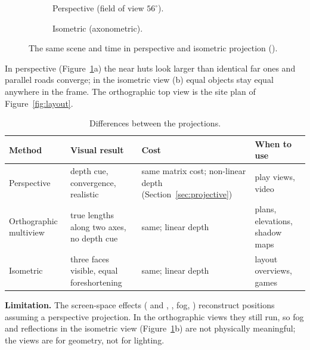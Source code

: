 \begin{figure}[htbp]
\centering
\begin{subfigure}[t]{0.495\linewidth}\caption{Perspective (field of view $56^\circ$).}\end{subfigure}\hfill
\begin{subfigure}[t]{0.495\linewidth}\caption{Isometric (axonometric).}\end{subfigure}
\caption{The same scene and time in perspective and isometric projection ().}
\label{fig:proj}
\end{figure}

In perspective (Figure~\ref{fig:proj}a) the near huts look larger than identical far ones and parallel roads
converge; in the isometric view (b) equal objects stay equal anywhere in the frame. The orthographic top view is the
site plan of Figure~\ref{fig:layout}.

\begin{table}[htbp]
\caption{Differences between the projections.}
\centering\small
\begin{tabularx}{\linewidth}{@{}lXXl@{}}
\toprule
Method & Visual result & Cost & When to use\\\midrule
Perspective & depth cue, convergence, realistic & same matrix cost; non-linear depth (Section~\ref{sec:projective}) & play views, video\\
Orthographic multiview & true lengths along two axes, no depth cue & same; linear depth & plans, elevations, shadow maps\\
Isometric & three faces visible, equal foreshortening & same; linear depth & layout overviews, games\\
\bottomrule
\end{tabularx}
\end{table}

\textbf{Limitation.} The screen-space effects ( and , , fog, ) reconstruct positions assuming a perspective
projection. In the orthographic views they still run, so fog and reflections in the isometric view (Figure~\ref{fig:proj}b) are not physically
meaningful; the views are for geometry, not for lighting.
